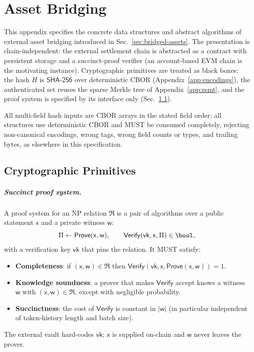 \chapter{Asset Bridging}\label{app:bridging}

This appendix specifies the concrete data structures and abstract algorithms of external asset bridging introduced in Sec.~\ref{sec:bridged-assets}. The presentation is chain-independent: the external settlement chain is abstracted as a contract with persistent storage and a succinct-proof verifier (an account-based EVM chain is the motivating instance). Cryptographic primitives are treated as black boxes: the hash $H$ is $\mathsf{SHA\text{-}256}$ over deterministic CBOR (Appendix~\ref{app:encodings}), the authenticated set reuses the sparse Merkle tree of Appendix~\ref{app:rsmt}, and the proof system is specified by its interface only (Sec.~\ref{app:bridging-primitives}).

All multi-field hash inputs are CBOR arrays in the stated field order; all structures use deterministic CBOR and MUST be consumed completely, rejecting non-canonical encodings, wrong tags, wrong field counts or types, and trailing bytes, as elsewhere in this specification.

\section{Cryptographic Primitives}\label{app:bridging-primitives}

\paragraph{Succinct proof system.}
A proof system for an NP relation $\mathfrak{R}$ is a pair of algorithms over a public statement $\mathsf{x}$ and a private witness $\mathsf{w}$:
\[
\Pi \gets \mathsf{Prove}(\mathsf{x},\mathsf{w}), \qquad
\mathsf{Verify}(\mathsf{vk},\mathsf{x},\Pi) \in \bool,
\]
with a verification key $\mathsf{vk}$ that pins the relation. It MUST satisfy:
\begin{itemize}
  \item \textbf{Completeness}: if $(\mathsf{x},\mathsf{w}) \in \mathfrak{R}$ then $\mathsf{Verify}(\mathsf{vk},\mathsf{x},\mathsf{Prove}(\mathsf{x},\mathsf{w}))=1$.
  \item \textbf{Knowledge soundness}: a prover that makes $\mathsf{Verify}$ accept knows a witness $\mathsf{w}$ with $(\mathsf{x},\mathsf{w}) \in \mathfrak{R}$, except with negligible probability.
  \item \textbf{Succinctness}: the cost of $\mathsf{Verify}$ is constant in $|\mathsf{w}|$ (in particular independent of token-history length and batch size).
\end{itemize}
The external vault hard-codes $\mathsf{vk}$; $\mathsf{x}$ is supplied on-chain and $\mathsf{w}$ never leaves the prover.

